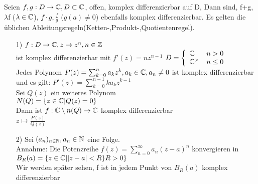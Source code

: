\begin{satz}
Seien $f,g: D \to \mathbb{C}, D\subset \mathbb{C}$, offen, komplex differenzierbar auf D, Dann sind, f+g, $\lambda$f ($\lambda \in \mathbb{C}$), $f \cdot g, \frac{f}{g}$ ($g(a) \neq 0$) ebenfalls komplex differenzierbar. Es gelten die üblichen Ableitungsregeln(Ketten-,Produkt-,Quotientenregel).
\end{satz}
\begin{beispiel}
	\leavevmode
	\begin{itemize}
		\item[1)]
		$f: D \to \mathbb{C}, z\mapsto z^n, n \in \mathbb{Z}  $\\
		ist komplex differenzierbar mit $f\prime(z) = n z^{n-1}$ 
		$D = \left\{
		\begin{array}{ll}
		\mathbb{C} &n > 0\\
		\mathbb{C}^{\times} &n \leq 0
		\end{array}\right. $ \\
		Jedes Polynom $ P(z) = \sum_{k=0}^{n} a_k z^k ,a_k \in \mathbb{C} , a_n \ne 0$ ist komplex differenzierbar und es gilt: $P\prime(z) = \sum^{n - 1}_{k=0} k a_k z^{k-1}$ \\
		Sei $Q(z)$ ein weiteres Polynom\\
		$N(Q) = \{z \in \mathbb{C}| Q(z)=0\}$\\
		Dann ist $f :\mathbb{C} \setminus n(Q) \to \mathbb{C}$ komplex differenzierbar\\
		$z \mapsto \frac{P(z)}{Q(z)}$
		\item[2)]
		Sei $(a_n)_{n \in \mathbb{N}}, a_n \in \mathbb{N}$ eine Folge.\\
		Annahme: Die Potenzreihe $f(z) = \sum^\infty_{n=0} a_n(z-a)^n$
		konvergieren in \\
		$B_{R}(a)=\{z \in \mathbb{C}| |z-a|<R\} R>0\}$ \\
		Wir werden später sehen, f ist in jedem Punkt von $B_R(a)$ 
		komplex differenzierbar\\
	\end{itemize}
\end{beispiel}



